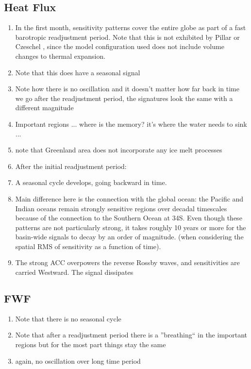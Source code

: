 \documentclass[a4paper,11pt]{article}
\begin{document}
   \subsection{Heat Flux} 
    \begin{enumerate} 
	\item In the first month, sensitivity patterns cover the entire globe as part of a fast barotropic readjustment period. Note that this is not exhibited by Pillar or Czeschel \cite{pillarAttribution}, \cite{czeschelOscillatory} since the model configuration used does not include volume changes to thermal expansion. 
	\item Note that this does have a seasonal signal 
	\item Note how there is no oscillation and it doesn't matter how far back in time we go after the readjustment period, the signatures look the same with a different magnitude
	\item Important regions ... where is the memory? it's where the water needs to sink ... 
	\item note that Greenland area does not incorporate any ice melt processes 
	\item After the initial readjustment period:
	\item A seasonal cycle develops, going backward in time. 
	\item Main difference here is the connection with the global ocean: the Pacific and Indian oceans remain strongly sensitive regions over decadal timescales because of the connection to the Southern Ocean at 34S. Even though these patterns are not particularly strong, it takes roughly 10 years or more for the basin-wide signals to decay by an order of magnitude. (when considering the spatial RMS of sensitivity as a function of time).  
	\item The strong ACC overpowers the reverse Rossby waves, and sensitivities are carried Westward. The signal dissipates 
    \end{enumerate} 
   \subsection{FWF}
    \begin{enumerate}
	\item Note that there is no seasonal cycle
	\item Note that after a readjustment period there is a ''breathing`` in the important regions but for the most part things stay the same 
	\item again, no oscillation over long time period
    \end{enumerate} 
\end{document}
